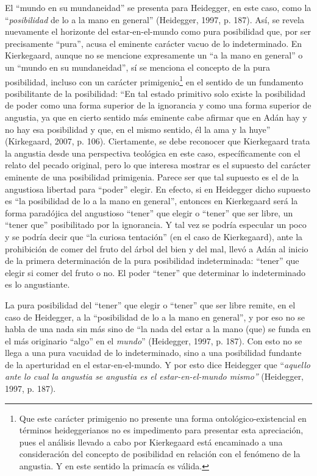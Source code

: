 \begin{refsection}
El ``mundo en su mundaneidad'' se presenta para Heidegger, en este caso, como la ``\emph{posibilidad} de lo a la mano en general'' (Heidegger, 1997, p. 187). Así, se revela nuevamente el horizonte del estar-en-el-mundo como pura posibilidad que, por ser precisamente ``pura'', acusa el eminente carácter vacuo de lo indeterminado. En Kierkegaard, aunque no se mencione expresamente un ``a la mano en general'' o un ``mundo en su mundaneidad'', sí se menciona el concepto de la pura posibilidad, incluso con un carácter primigenio\footnote{Que este carácter primigenio no presente una forma ontológico-existencial en términos heideggerianos no es impedimento para presentar esta apreciación, pues el análisis llevado a cabo por Kierkegaard está encaminado a una consideración del concepto de posibilidad en relación con el fenómeno de la angustia. Y en este sentido la primacía es válida.} en el sentido de un fundamento posibilitante de la posibilidad: ``En tal estado primitivo solo existe la posibilidad de poder como una forma superior de la ignorancia y como una forma superior de angustia, ya que en cierto sentido más eminente cabe afirmar que en Adán hay y no hay esa posibilidad y que, en el mismo sentido, él la ama y la huye'' (Kirkegaard, 2007, p. 106). Ciertamente, se debe reconocer que Kierkegaard trata la angustia desde una perspectiva teológica en este caso, específicamente con el relato del pecado original, pero lo que interesa mostrar es el supuesto del carácter eminente de una posibilidad primigenia. Parece ser que tal supuesto es el de la angustiosa libertad para ``poder'' elegir. En efecto, si en Heidegger dicho supuesto es ``la posibilidad de lo a la mano en general'', entonces en Kierkegaard será la forma paradójica del angustioso ``tener'' que elegir o ``tener'' que ser libre, un ``tener que'' posibilitado por la ignorancia. Y tal vez se podría especular un poco y se podría decir que ``la curiosa tentación'' (en el caso de Kierkegaard), ante la prohibición de comer del fruto del árbol del bien y del mal, llevó a Adán al inicio de la primera determinación de la pura posibilidad indeterminada: ``tener'' que elegir si comer del fruto o no. El poder ``tener'' que determinar lo indeterminado es lo angustiante.

La pura posibilidad del ``tener'' que elegir o ``tener'' que ser libre remite, en el caso de Heidegger, a la ``posibilidad de lo a la mano en general'', y por eso no se habla de una nada sin más sino de ``la nada del estar a la mano (que) se funda en el más originario ``algo'' en el \emph{mundo}'' (Heidegger, 1997, p. 187). Con esto no se llega a una pura vacuidad de lo indeterminado, sino a una posibilidad fundante de la aperturidad en el estar-en-el-mundo. Y por esto dice Heidegger que ``\emph{aquello ante lo cual la angustia se angustia es el estar-en-el-mundo mismo''} (Heidegger, 1997, p. 187).


\end{refsection}
